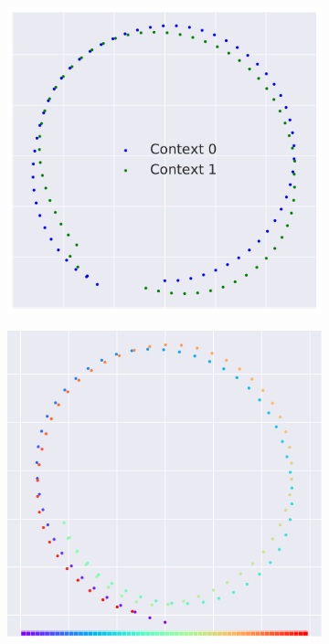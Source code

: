 \documentclass{article} %
\begin{document}
\begin{figure}[t]
    \centering
    \begin{subfigure}{0.24\columnwidth}
    \centering
    \includegraphics[scale=0.185]{figures/circle_trajs/result_4.pdf}
    \caption{}
    \end{subfigure}%
    \centering
    \begin{subfigure}{0.24\columnwidth}
    \centering
    \includegraphics[scale=0.185]{figures/circle_trajs/result_4_rainbow_opposite_cropped.pdf}

\end{subfigure}
\end{figure}
\end{document}
